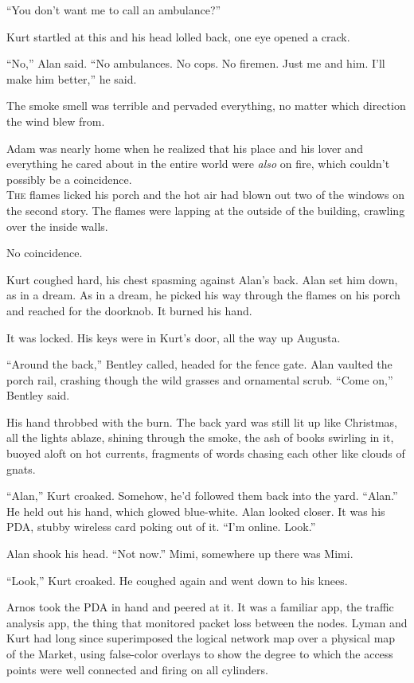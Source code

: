 ``You don't want me to call an ambulance?''

Kurt startled at this and his head lolled back, one eye opened a
crack.

``No,'' Alan said.  ``No ambulances.  No cops.  No firemen.  Just me
and him.  I'll make him better,'' he said.

The smoke smell was terrible and pervaded everything, no matter which
direction the wind blew from. 

Adam was nearly home when he realized that his place and his lover and
everything he cared about in the entire world were \textit{also} on
fire, which couldn't possibly be a coincidence.
\\
\lettrine[lines=3, lhang=.5, nindent=0pt, findent=2pt]{T}{he} flames licked his porch and the hot air had blown out two of the
windows on the second story.  The flames were lapping at the outside
of the building, crawling over the inside walls. 

No coincidence. 

Kurt coughed hard, his chest spasming against Alan's back.  Alan set
him down, as in a dream.  As in a dream, he picked his way through the
flames on his porch and reached for the doorknob.  It burned his hand. 

It was locked.  His keys were in Kurt's door, all the way up Augusta.

``Around the back,'' Bentley called, headed for the fence gate.  Alan
vaulted the porch rail, crashing though the wild grasses and
ornamental scrub.  ``Come on,'' Bentley said.

His hand throbbed with the burn.  The back yard was still lit up like
Christmas, all the lights ablaze, shining through the smoke, the ash
of books swirling in it, buoyed aloft on hot currents, fragments of
words chasing each other like clouds of gnats.

``Alan,'' Kurt croaked.  Somehow, he'd followed them back into the
yard.  ``Alan.'' He held out his hand, which glowed blue-white.  Alan
looked closer.  It was his PDA, stubby wireless card poking out of it. 
``I'm online.  Look.''

Alan shook his head.  ``Not now.'' Mimi, somewhere up there was Mimi. 

``Look,'' Kurt croaked.  He coughed again and went down to his knees. 

Arnos took the PDA in hand and peered at it.  It was a familiar app,
the traffic analysis app, the thing that monitored packet loss between
the nodes.  Lyman and Kurt had long since superimposed the logical
network map over a physical map of the Market, using false-color
overlays to show the degree to which the access points were well
connected and firing on all cylinders. 

